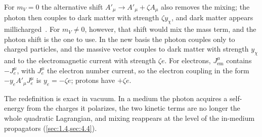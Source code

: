 For $m_V = 0$ the alternative shift $A'_\mu \to A'_\mu + \zeta A_\mu$ also removes the mixing; the photon then couples to dark matter with strength $\zeta y_\chi$, and dark matter appears millicharged~\cite[Eq.~(71)]{lin2019tasi}. For $m_V \neq 0$, however, that shift would mix the mass term, and the photon shift is the one to use. In the new basis the photon couples only to charged particles, and the massive vector couples to dark matter with strength $y_\chi$ and to the electromagnetic current with strength $\zeta e$. For electrons, $J^\mu_{\mathrm{em}}$ contains $-J^\mu_e$, with $J^\mu_e$ the electron number current, so the electron coupling in the form $-y_e A'_\mu J^\mu_e$ is $y_e = -\zeta e$; protons have $+\zeta e$.

The redefinition is exact in vacuum. In a medium the photon acquires a self-energy from the charges it polarizes, the two kinetic terms are no longer the whole quadratic Lagrangian, and mixing reappears at the level of the in-medium propagators (\cref{sec:1.4,sec:4.4}).
